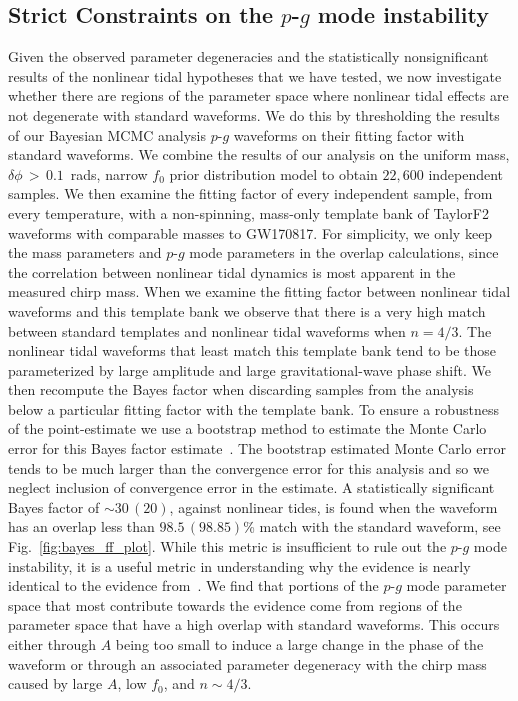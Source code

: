 \subsection{Strict Constraints on the $p$-$g$ mode instability}
Given the observed parameter degeneracies and the statistically nonsignificant results of the nonlinear tidal hypotheses that we have tested, we now investigate whether there are regions of the parameter space where nonlinear tidal effects are not degenerate with standard waveforms. We do this by thresholding the results of our Bayesian MCMC analysis $p$-$g$ waveforms on their fitting factor with standard waveforms. We combine the results of our analysis on the uniform mass, $\delta \phi \, > \, 0.1$~rads, narrow $f_0$ prior distribution model to obtain $22,600$ independent samples. We then examine the fitting factor of every independent sample, from every temperature, with a non-spinning, mass-only template bank of TaylorF2 waveforms with comparable masses to GW170817. For simplicity, we only keep the mass parameters and $p$-$g$ mode parameters in the overlap calculations, since the correlation between nonlinear tidal dynamics is most apparent in the measured chirp mass. When we examine the fitting factor between nonlinear tidal waveforms and this template bank we observe that there is a very high match between standard templates and nonlinear tidal waveforms when $n = 4/3$. The nonlinear tidal waveforms that least match this template bank tend to be those parameterized by large amplitude and large gravitational-wave phase shift. We then recompute the Bayes factor when discarding samples from the analysis below a particular fitting factor with the template bank. To ensure a robustness of the point-estimate we use a bootstrap method to estimate the Monte Carlo error for this Bayes factor estimate~\citep{efron1992bootstrap}. The bootstrap estimated Monte Carlo error tends to be much larger than the convergence error for this analysis and so we neglect inclusion of convergence error in the estimate. A statistically significant Bayes factor of $\sim 30 \, (20)$, against nonlinear tides, is found when the waveform has an overlap less than $98.5 \, (98.85)$\% match with the standard waveform, see Fig.~\ref{fig:bayes_ff_plot}. While this metric is insufficient to rule out the $p$-$g$ mode instability, it is a useful metric in understanding why the evidence is nearly identical to the evidence from~\cite{de2018tidal}. We find that portions of the $p$-$g$ mode parameter space that most contribute towards the evidence come from regions of the parameter space that have a high overlap with standard waveforms. This occurs either through $A$ being too small to induce a large change in the phase of the waveform or through an associated parameter degeneracy with the chirp mass caused by large $A$, low $f_0$, and $n \sim 4/3$.

